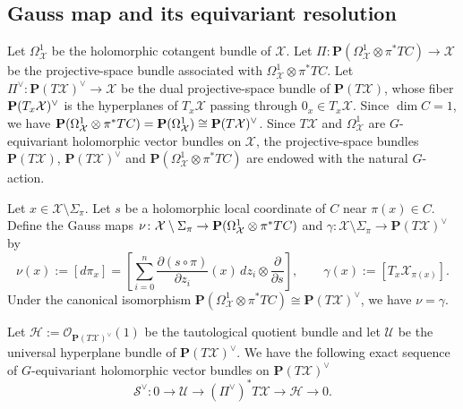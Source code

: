 \documentclass[amscd, leqno]{amsart}
\theoremstyle{plain}
\theoremstyle{definition}
\theoremstyle{remark}
\begin{document}
\subsection
{Gauss map and its equivariant resolution}
\label{sect:3.2}
\par
Let $\Omega^{1}_{\mathcal X}$ be the holomorphic cotangent bundle of ${\mathcal X}$.
Let $\varPi\colon{\mathbf P}(\Omega^{1}_{\mathcal X}\otimes\pi^{*}TC)\to{\mathcal X}$ 
be the projective-space bundle associated with $\Omega^{1}_{\mathcal X}\otimes\pi^{*}TC$. 
Let $\varPi^{\lor}\colon{\mathbf P}(T{\mathcal X})^{\lor}\to{\mathcal X}$ 
be the dual projective-space bundle of ${\mathbf P}(T{\mathcal X})$, 
whose fiber ${\bf P}(T_{x}{\mathcal X})^{\lor}$ is the hyperplanes of $T_{x}{\mathcal X}$ passing through $0_{x}\in T_{x}{\mathcal X}$. 
Since $\dim C=1$, we have 
${\mathbf P}(\Omega^{1}_{\mathcal X}\otimes\pi^{*}TC) = {\mathbf P}(\Omega^{1}_{\mathcal X})\cong{\bf P}(T{\mathcal X})^{\lor}$. 
Since $T{\mathcal X}$ and $\Omega_{\mathcal X}^{1}$ are $G$-equivariant holomorphic vector bundles on ${\mathcal X}$, 
the projective-space bundles ${\mathbf P}(T{\mathcal X})$, ${\mathbf P}(T{\mathcal X})^{\lor}$ and 
${\mathbf P}(\Omega_{\mathcal X}^{1}\otimes \pi^{*}TC)$ are endowed with the natural $G$-action. 
\par
Let $x\in{\mathcal X}\setminus\Sigma_{\pi}$. Let $s$ be a holomorphic local coordinate of $C$ near $\pi(x)\in C$. 
Define the Gauss maps
$\nu\colon{\mathcal X}\setminus\Sigma_{\pi}\to{\bf P}(\Omega^{1}_{\mathcal X}\otimes\pi^{*}TC)$ 
and $\gamma\colon{\mathcal X}\setminus\Sigma_{\pi} \to {\mathbf P}(T{\mathcal X})^{\lor}$ by
$$
\nu(x) := [ d\pi_{x} ] = \left[ \sum_{i=0}^{n}\frac{\partial(s\circ\pi)} {\partial z_{i}}(x)\,dz_{i} \otimes \frac{\partial}{\partial s} \right],
\qquad
\gamma(x) := [T_{x}{\mathcal X}_{\pi(x)}].
$$
Under the canonical isomorphism ${\mathbf P}(\Omega^{1}_{\mathcal X}\otimes\pi^{*}TC) \cong {\mathbf P}(T{\mathcal X})^{\lor}$, we have $\nu=\gamma$.
\par
Let ${\mathcal H}:={\mathcal O}_{{\mathbf P}(T{\mathcal X})^{\lor}}(1)$ be the tautological quotient bundle 
and let ${\mathcal U}$ be the universal hyperplane bundle of ${\mathbf P}(T{\mathcal X})^{\lor}$. 
We have the following exact sequence of $G$-equivariant holomorphic vector bundles on ${\mathbf P}(T{\mathcal X})^{\lor}$
$$
{\mathcal S}^{\lor} \colon 0 \longrightarrow  {\mathcal U} \longrightarrow (\varPi^{\lor})^{*}T{\mathcal X} \longrightarrow {\mathcal H} \longrightarrow 0.
$$
\par
\end{document}
